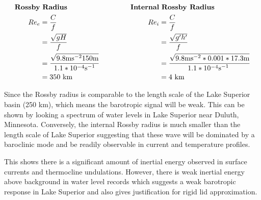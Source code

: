\begin{equation*}
\begin{aligned}[c]
	\text{\bf Rossby} & \text{ \bf Radius} \\ 
	Re_e & = \frac{ C }{ f } \\ 
	& = \frac{  \sqrt{gH}  }{ f } \\ 
	&=\frac{ \sqrt{9.8 \text{ms$^{-2}$} 150 \text{m}} }{ 1.1*10^{-4} \text{s$^{-1}$} } \\
	& = 350 \text{ km}
\end{aligned}
\qquad\ \qquad
\begin{aligned}[c]
	\text{\bf Internal} & \text{ \bf Rossby Radius} \\ 
	Re_i & = \frac{ C }{ f } \\ 
	& = \frac{ \sqrt{ g^{\prime} h^{\prime} } }{ f } \\ 
	&=\frac{\sqrt{9.8  \text{ms$^{-2}$} * 0.001 * 17.3 \text{m} }} { 1.1*10^{-4} \text{s$^{-1}$ } } \\
	& = 4 \text{ km}
\end{aligned}
\end{equation*}

Since the Rossby radius is comparable to the length scale of the Lake Superior basin  (250 km), which means the barotropic signal will be weak. This can be shown by looking
a spectrum of water levels in Lake Superior near Duluth, Minnesota. Conversely, the internal Rossby radius is much smaller than the length scale of Lake Superior suggesting
that these wave will be dominated by a baroclinic mode and be readily observable in current and temperature profiles.


This shows there is a significant amount of inertial energy observed in surface currents and thermocline undulations. However, there is weak inertial energy above background in
water level records which suggests a weak barotropic response in Lake Superior and also gives justification for rigid lid approximation. 


